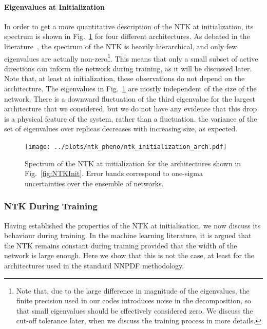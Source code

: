 \paragraph{Eigenvalues at Initialization}
In order to get a more quantitative description of the NTK at initialization,
its spectrum is shown in Fig.~\ref{fig:NTKSpectrum} for four different
architectures. As debated in the literature~\cite{XXX}, the spectrum of the NTK
is heavily hierarchical, and only few eigenvalues are actually
non-zero\footnote{Note that, due to the large difference in magnitude of the
eigenvalues, the finite precision used in our codes introduces noise in the
decomposition, so that small eigenvalues should be effectively considered zero.
We discuss the cut-off tolerance later, when we discuss the training process in
more details.}. This means that only a small subset of active directions can
inform the network during training, as it will be discussed later. Note that, at
least at initialization, these observations do not depend on the architecture.
The eigenvalues in Fig.~\ref{fig:NTKSpectrum} are mostly independent of the size
of the network. There is a downward fluctuation of the third eigenvalue for the
largest architecture that we considered, but we do not have any evidence that
this drop is a physical feature of the system, rather than a fluctuation. the
variance of the set of eigenvalues over replicas decreases with increasing size,
as expected. 

\begin{figure}[ht!]
  \centering

  \texttt{[image: ../plots/ntk\_pheno/ntk\_initialization\_arch.pdf]}
  \caption{Spectrum of the NTK at initialization for the architectures shown in
  Fig.~\ref{fig:NTKInit}. Error bands correspond to one-sigma uncertainties over
  the ensemble of networks.}
  \label{fig:NTKSpectrum}
\end{figure}

\FloatBarrier

\subsubsection{NTK During Training}
\label{sec:NTKDuringTraining}

Having established the properties of the NTK at initialisation, we now discuss
its behaviour during training. In the machine learning literature, it is argued
that the NTK remains constant during training provided that the width of the
network is large enough. Here we show that this is not the case, at least for
the architectures used in the standard NNPDF methodology. 

